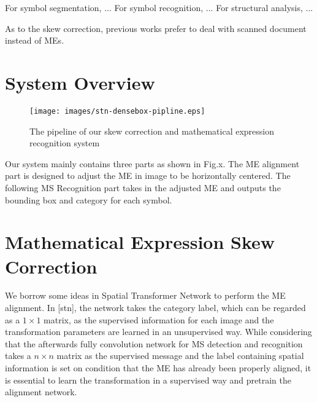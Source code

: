 \documentclass[10pt,conference,a4paper]{IEEEtran}
\begin{document}
	For symbol segmentation, ... %
	For symbol recognition, ...
	For structural analysis, ... 
	
	As to the skew correction, previous works prefer to deal with scanned document instead of MEs. 
	
	\section{System Overview}
	\begin{figure*}
		\centering
		\texttt{[image: images/stn-densebox-pipline.eps]}
		\caption[overview]{The pipeline of our skew correction and mathematical expression recognition system}
	\end{figure*}
	Our system mainly contains three parts as shown in Fig.x. The ME alignment part is designed to adjust the ME in image to be horizontally centered. The following MS Recognition part takes in the adjusted ME and outputs the bounding box and category for each symbol. 
	\section{Mathematical Expression Skew Correction}
	We borrow some ideas in Spatial Transformer Network to perform the ME alignment. In [stn], the network takes the category label, which can be regarded as a $1 \times 1$ matrix, as the supervised information for each image and the transformation parameters are learned in an unsupervised way. While considering that the afterwards fully convolution network for MS detection and recognition takes a $n \times n$ matrix as the supervised message and the label containing spatial information is set on condition that the ME has already been properly aligned, it is essential to learn the transformation in a supervised way and pretrain the alignment network.
	
\end{document}

